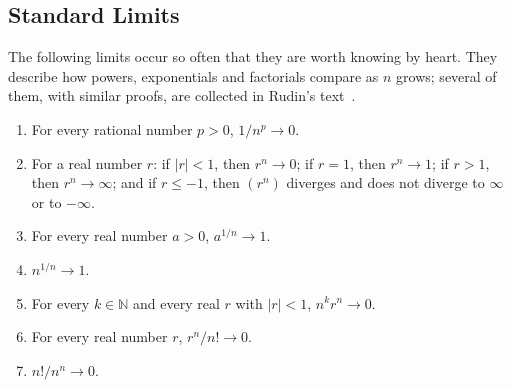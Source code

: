 \subsection{Standard Limits}

The following limits occur so often that they are worth knowing by heart. They describe how powers, exponentials and factorials compare as $n$ grows; several of them, with similar proofs, are collected in Rudin's text~\cite{rudin1976}.

\begin{theorem}
\label{thm:standard-limits}
\leavevmode
\begin{enumerate}
\item For every rational number $p>0$, $1/n^p\to0$.
\item For a real number $r$: if $|r|<1$, then $r^n\to0$; if $r=1$, then $r^n\to1$; if $r>1$, then $r^n\to\infty$; and if $r\le-1$, then $(r^n)$ diverges and does not diverge to $\infty$ or to $-\infty$.
\item For every real number $a>0$, $a^{1/n}\to1$.
\item $n^{1/n}\to1$.
\item For every $k\in\mathbb N$ and every real $r$ with $|r|<1$, $n^kr^n\to0$.
\item For every real number $r$, $r^n/n!\to0$.
\item $n!/n^n\to0$.
\end{enumerate}
\end{theorem}

